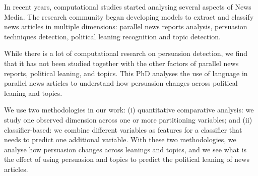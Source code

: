 In recent years, computational studies started analysing several aspects of News Media.
The research community began
developing models to extract and classify news articles in multiple dimensions: parallel news reports analysis, persuasion techniques detection, political leaning recognition and topic detection.

While there is a lot of computational research on persuasion detection, we find that it has not been studied together with the other factors of
parallel news reports, political leaning, and topics.
%
%
This PhD analyses the use of language in parallel news articles to understand how persuasion changes across political leaning and topics.


We use two methodologies in our work:
(i) quantitative comparative analysis: we study one observed dimension across one or more partitioning variables; and
(ii) classifier-based: we combine different variables as features for a classifier that needs to predict one additional variable.
With these two methodologies, we analyse how persuasion changes across leanings and topics, and we see what is the effect of using persuasion and topics to predict the political leaning of news articles.


